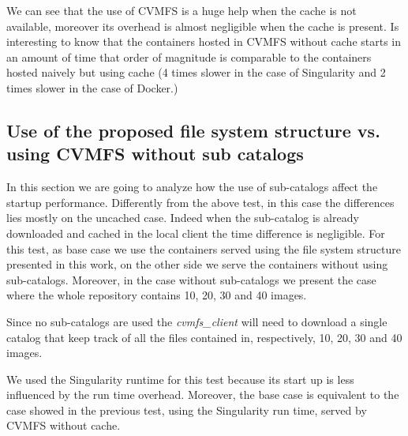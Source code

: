 

We can see that the use of CVMFS is a huge help when the cache is not
available, moreover its overhead is almost negligible when the cache is
present. Is interesting to know that the containers hosted in CVMFS without
cache starts in an amount of time that order of magnitude is comparable to the
containers hosted naively but using cache (4 times slower in the case of
Singularity and 2 times slower in the case of Docker.)

\subsection{Use of the proposed file system structure vs. using CVMFS without sub catalogs}

In this section we are going to analyze how the use of sub-catalogs affect the
startup performance. Differently from the above test, in this case the
differences lies mostly on the uncached case. Indeed when the sub-catalog is
already downloaded and cached in the local client the time difference is
negligible. For this test, as base case we use the containers served using the file
system structure presented in this work, on the other side we serve the
containers without using sub-catalogs. Moreover, in the case without
sub-catalogs we present the case where the whole repository contains 10,
20, 30 and 40 images.

Since no sub-catalogs are used the \textit{cvmfs\_client} will need to download
a single catalog that keep track of all the files contained in, respectively,
10, 20, 30 and 40 images.

We used the Singularity runtime for this test because its start up is less
influenced by the run time overhead. Moreover, the base case is equivalent to
the case showed in the previous test, using the Singularity run time, served by
CVMFS without cache. 


